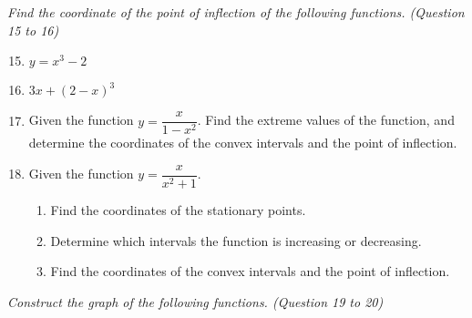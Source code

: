 \documentclass{report}
\begin{document}
\hspace{0.5em} \textit{Find the coordinate of the point of inflection of the following functions. (Question 15 to 16)}
\begin{enumerate}
    \setcounter{enumi}{14}
    \item $y = x^3 - 2$
    \item $3x + {(2-x)}^3$
    \item Given the function $y = \dfrac{x}{1-x^2}$. Find the extreme values of the
          function, and determine the coordinates of the convex intervals and the point
          of inflection.
    \item Given the function $y = \dfrac{x}{x^2 + 1}$.
          \begin{enumerate}
              \item Find the coordinates of the stationary points.
              \item Determine which intervals the function is increasing or decreasing.
              \item Find the coordinates of the convex intervals and the point of inflection.
          \end{enumerate}
\end{enumerate}
\hspace{0.5em} \textit{Construct the graph of the following functions. (Question 19 to 20)}
\end{document}
